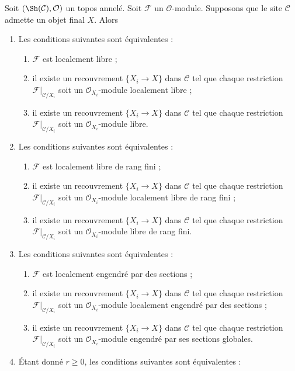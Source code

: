 \begin{lemma}
\label{lemma-local-final-object}
Soit $(\Sh(\mathcal{C}), \mathcal{O})$ un topos annelé.
Soit $\mathcal{F}$ un $\mathcal{O}$-module.
Supposons que le site $\mathcal{C}$ admette un objet final $X$.
Alors
\begin{enumerate}
\item Les conditions suivantes sont équivalentes :
\begin{enumerate}
\item $\mathcal{F}$ est localement libre ;
\item il existe un recouvrement $\{X_i \to X\}$ dans $\mathcal{C}$ tel que
chaque restriction $\mathcal{F}|_{\mathcal{C}/X_i}$ soit un
$\mathcal{O}_{X_i}$-module localement libre ;
\item il existe un recouvrement $\{X_i \to X\}$ dans $\mathcal{C}$ tel que
chaque restriction $\mathcal{F}|_{\mathcal{C}/X_i}$ soit un
$\mathcal{O}_{X_i}$-module libre.
\end{enumerate}
\item Les conditions suivantes sont équivalentes :
\begin{enumerate}
\item $\mathcal{F}$ est localement libre de rang fini ;
\item il existe un recouvrement $\{X_i \to X\}$ dans $\mathcal{C}$ tel que
chaque restriction $\mathcal{F}|_{\mathcal{C}/X_i}$ soit un
$\mathcal{O}_{X_i}$-module localement libre de rang fini ;
\item il existe un recouvrement $\{X_i \to X\}$ dans $\mathcal{C}$ tel que
chaque restriction $\mathcal{F}|_{\mathcal{C}/X_i}$ soit un
$\mathcal{O}_{X_i}$-module libre de rang fini.
\end{enumerate}
\item Les conditions suivantes sont équivalentes :
\begin{enumerate}
\item $\mathcal{F}$ est localement engendré par des sections ;
\item il existe un recouvrement $\{X_i \to X\}$ dans $\mathcal{C}$ tel que
chaque restriction $\mathcal{F}|_{\mathcal{C}/X_i}$ soit un
$\mathcal{O}_{X_i}$-module localement engendré par des sections ;
\item il existe un recouvrement $\{X_i \to X\}$ dans $\mathcal{C}$ tel que
chaque restriction $\mathcal{F}|_{\mathcal{C}/X_i}$ soit un
$\mathcal{O}_{X_i}$-module engendré par ses sections globales.
\end{enumerate}
\item Étant donné $r \geq 0$, les conditions suivantes sont équivalentes :

\end{enumerate}
\end{lemma}
